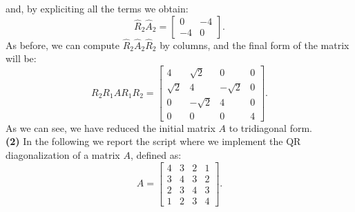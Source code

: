 \documentclass[a4paper,11pt]{article}
\begin{document}
and, by expliciting all the terms we obtain:
\begin{equation}\label{key}
	\hat{R}_2 \hat{A}_2 = \left[ \begin{array}{cc}
		0 & -4 \\
		-4 & 0
	\end{array}\right].
\end{equation}
As before, we can compute $\hat{R}_2 \hat{A}_2 \hat{R}_2$ by columns, and the final form of the matrix will be:
\begin{equation}\label{key}
	R_2R_1AR_1R_2 =\begin{bmatrix}
		4& \sqrt{2} & 0  &  0\\
		\sqrt{2}&4 & -\sqrt{2} & 0\\
		0 & -\sqrt{2} & 4  & 0 \\
		0 & 0 & 0 & 4
	\end{bmatrix}.
\end{equation}
As we can see, we have reduced the initial matrix $A$ to tridiagonal form.\\

\noindent \textbf{(2)} In the following we report the script where we implement the QR diagonalization of a matrix $A$, defined as:
\begin{equation}
	A = \begin{bmatrix}
		4 & 3 & 2 & 1 \\
		3 & 4 & 3 & 2 \\
		2 & 3 & 4 & 3 \\
		1 & 2 & 3 & 4
	\end{bmatrix}.
\end{equation}
\end{document}
